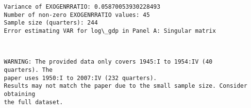 \documentclass[11pt]{article}
\begin{document}
    \begin{Verbatim}[commandchars=\\\{\}]
Variance of EXOGENRRATIO: 0.05870053930228493
Number of non-zero EXOGENRRATIO values: 45
Sample size (quarters): 244
Error estimating VAR for log\_gdp in Panel A: Singular matrix
    \end{Verbatim}

    \begin{center}
    \end{center}
    { \hspace*{\fill} \\}
    
    \begin{Verbatim}[commandchars=\\\{\}]
WARNING: The provided data only covers 1945:I to 1954:IV (40 quarters). The
paper uses 1950:I to 2007:IV (232 quarters).
Results may not match the paper due to the small sample size. Consider obtaining
the full dataset.
    \end{Verbatim}
\end{document}
